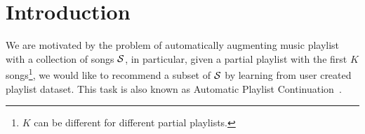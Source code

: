 \section{Introduction}
\label{sec:intro}

We are motivated by the problem of automatically augmenting music playlist with a collection of songs $\mathcal{S}$,
in particular, given a partial playlist with the first $K$ songs\footnote{$K$ can be different for different partial playlists.},
we would like to recommend a subset of $\mathcal{S}$ by learning from user created playlist dataset.
This task is also known as Automatic Playlist Continuation~\cite{schedl2017,recsysch2018}.
